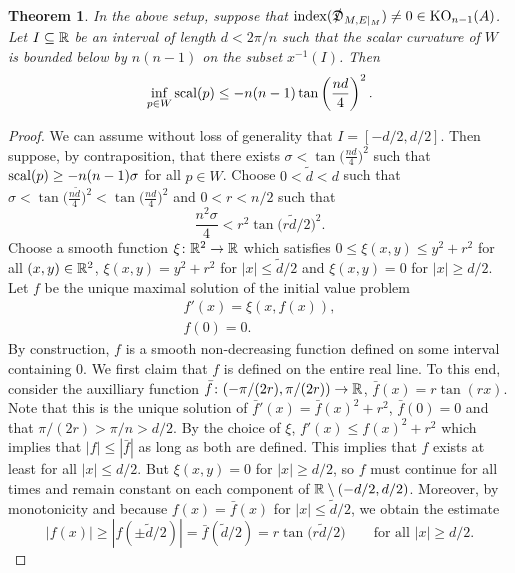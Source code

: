 \documentclass[pdftex]{sigma}
\numberwithin{equation}{section}
\newtheorem{Theorem}{Theorem}[section]
\begin{document}
\begin{Theorem}\label{thm:quantitative-codim-1}
 In the above setup, suppose that \(\operatorname{index}(\slashed{\mathfrak{D}}_{M, E|_M}) \neq 0 \in \operatorname{KO}_{n-1}(A)\).
 Let \(I \subseteq \mathbb{R}\) be an interval of length \(d < 2 \pi / n\) such that the scalar curvature of \(W\) is bounded below by \(n(n-1)\) on the subset \(x^{-1}(I)\).
 Then
 \begin{equation*}
 \inf_{p \in W} \operatorname{scal}(p) \leq - n(n-1) \tan\left(\frac{nd}{4}\right)^2.
 \end{equation*}
 \end{Theorem}
 \begin{proof}
 We can assume without loss of generality that \(I = [-d/2,d/2]\).
 Then suppose, by contraposition, that there exists \(\sigma < \tan\big(\frac{nd}{4}\big)^2\) such that \(\operatorname{scal}(p) \geq -n(n-1) \sigma\) for all \(p \in W\).
 Choose \(0 < \tilde{d} < d\) such that \(\sigma < \tan\big(\frac{n\tilde{d}}{4}\big)^2 < \tan\big(\frac{nd}{4}\big)^2\) and \(0 < r < n/2\) such that
 \begin{equation}
 \frac{n^2 \sigma}{4} < r^2 \tan\big(r\tilde{d}/2\big)^2. \label{eq:choose-r}
 \end{equation}
 Choose a smooth function \(\xi \colon \mathbb{R}^2 \to \mathbb{R}\) which satisfies \(0 \leq \xi(x,y) \leq y^2 + r^2\) for all \((x,y) \in \mathbb{R}^2\), \(\xi(x,y) = y^2 + r^2\) for \(|x| \leq \tilde{d}/2\) and \(\xi(x,y) = 0\) for \(|x| \geq d/2\).
 Let \(f\) be the unique maximal solution of the initial value problem
 \begin{gather*}
 f'(x) = \xi(x,f(x)), \\
 f(0) = 0.
 \end{gather*}
 By construction, \(f\) is a smooth non-decreasing function defined on some interval containing \(0\).
 We first claim that \(f\) is defined on the entire real line.
 To this end, consider the auxilliary function \(\bar{f} \colon (-\pi/(2 r), \pi/(2r)) \to \mathbb{R}\), \(\bar{f}(x) = r \tan(r x)\).
 Note that this is the unique solution of \(\bar{f}'(x)= \bar{f}(x)^2 + r^2\), \(\bar{f}(0) = 0\) and that \(\pi/(2r) > \pi /n > d/2\).
 By the choice of \(\xi\), \(f'(x) \leq f(x)^2 + r^2\) which implies that \(|f| \leq |\bar{f}|\) as long as both are defined.
 This implies that \(f\) exists at least for all \(|x| \leq d/2\).
 But \(\xi(x,y) = 0\) for \(|x| \geq d/2\), so \(f\) must continue for all times and remain constant on each component of \(\mathbb{R} \setminus (-d/2,d/2)\).
 Moreover, by monotonicity and because \(f(x) = \bar{f}(x)\) for \(|x| \leq \tilde{d}/2\), we obtain the estimate
 \begin{equation}
 |f(x)| \geq |f(\pm \tilde{d}/2)| = \bar{f}(\tilde{d}/2) = r \tan\big(r \tilde{d} / 2\big) \qquad \text{for all \(|x| \geq d/2\).}
 \label{eq:outside-bound}
 \end{equation}


\end{proof}
\end{document}
